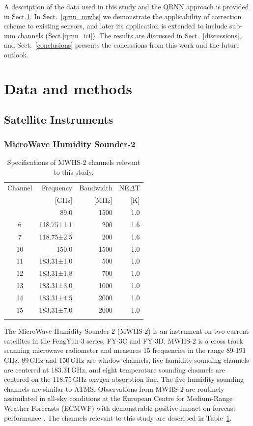 \documentclass[amt, manuscript]{copernicus}
\begin{document}
A description of the data used in this study and the QRNN approach is provided
in Sect.\ref{data_methods}. In Sect.~\ref{qrnn_mwhs} we demonstrate the
applicability of correction scheme to existing sensors, and later its
application is extended to include sub-mm channels (Sect.\ref{qrnn_ici}). The
results are discussed in Sect.~\ref{discussions}, and Sect.~\ref{conclusions}
presents the conclusions from this work and the future outlook.


\section{Data and methods}
\label{data_methods}
%
\subsection{Satellite Instruments}
%
\subsubsection{ MicroWave Humidity Sounder-2}
%
\begin{table}[t]
	\caption{Specifications of MWHS-2 channels relevant to this study.}
	\label{tab:specifications_MWHS2}	
	\begin{tabular}{crrr}
		\tophline
		Channel & Frequency 	& Bandwidth & NE$\Delta$T \\
		& [GHz]			& [MHz]		& [K]		\\
		\middlehline
		1	&	89.0   		  & 1500			&	1.0	\\
		6	&	118.75±1.1    & \phantom{0}200 	&	1.6\\
		7	&	118.75±2.5    & \phantom{0}200 	&	1.6\\
		10	&	150.0         & 1500 			&	1.0 \\
		11	&	183.31±1.0      & \phantom{0}500  &	1.0 \\
		12  & 	183.31±1.8    & \phantom{0}700 	&   1.0\\
		13  & 	183.31±3.0      & 1000    		&	1.0	\\
		14  & 	183.31±4.5    & 2000    		&	1.0\\
		15  & 	183.31±7.0      & 2000  			&	1.0  \\
		\bottomhline
	\end{tabular}
	\belowtable{} %
\end{table}
The MicroWave Humidity Sounder 2 (MWHS-2) is an instrument on two current satellites in the FengYun-3 series, FY-3C and FY-3D. MWHS-2 is a cross track scanning microwave radiometer and measures 15 frequencies in the range 89-191\,GHz. 89\,GHz and 150\,GHz are window channels, five humidity sounding channels are centered at 183.31\,GHz, and eight temperature sounding channels are centered on the 118.75\,GHz oxygen absorption line. The five humidity sounding channels are similar to ATMS. Observations from MWHS-2 are routinely assimilated in all-sky conditions at the European Centre for Medium-Range Weather Forecasts (ECMWF) with demonstrable positive impact on forecast performance \citep{duncan2020MWHS}. The channels relevant to this study are described in Table~\ref{tab:specifications_MWHS2}. 
\end{document}
